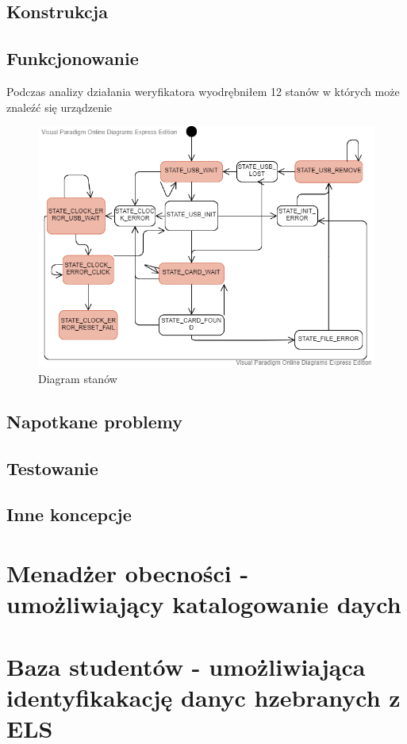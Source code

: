 \documentclass[declaration,shortabstract, mgr]{iithesis}
\begin{document}
\subsection{Konstrukcja}
\subsection{Funkcjonowanie}
\indent Podczas analizy działania weryfikatora wyodrębniłem 12 stanów w których może znaleźć się urządzenie
\begin{figure}[h]
\caption{Diagram stanów}
\centering
\includegraphics[scale=0.6]{state_machine.png}
\end{figure}

\subsection{Napotkane problemy}
\subsection{Testowanie}
\subsection{Inne koncepcje}
\section{Menadżer obecności - umożliwiający katalogowanie daych}
\section{Baza studentów - umożliwiająca identyfikakację danyc hzebranych z ELS}
\end{document}
